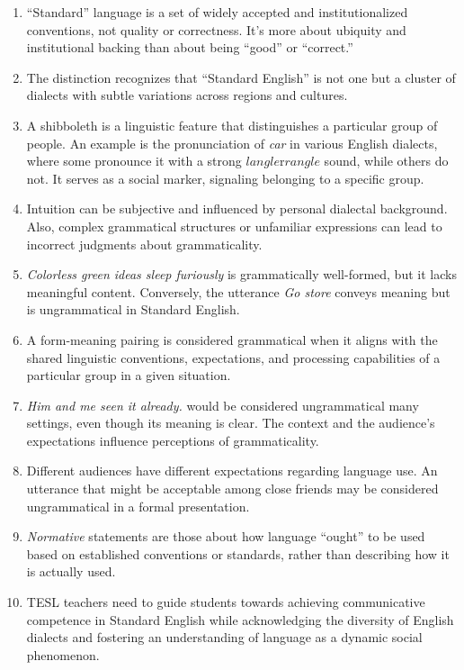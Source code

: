 \begin{tcolorbox}[title=Answer key, colback=white]

\begin{enumerate}[noitemsep]
    \item ``Standard'' language is a set of widely accepted and institutionalized conventions, not quality or correctness. It's more about ubiquity and institutional backing than about being ``good'' or ``correct.''
    \item The distinction recognizes that ``Standard English'' is not one but a cluster of dialects with subtle variations across regions and cultures.
    \item A shibboleth is a linguistic feature that distinguishes a particular group of people. An example is the pronunciation of \textit{car} in various English dialects, where some pronounce it with a strong $langle$r$rangle$ sound, while others do not. It serves as a social marker, signaling belonging to a specific group.
    \item Intuition can be subjective and influenced by personal dialectal background. Also, complex grammatical structures or unfamiliar expressions can lead to incorrect judgments about grammaticality.
    \item \textit{Colorless green ideas sleep furiously} is grammatically well-formed, but it lacks meaningful content. Conversely, the utterance \textit{Go store} conveys meaning but is ungrammatical in Standard English.
    \item A form-meaning pairing is considered grammatical when it aligns with the shared linguistic conventions, expectations, and processing capabilities of a particular group in a given situation.
    \item \textit{Him and me seen it already.} would be considered ungrammatical many settings, even though its meaning is clear. The context and the audience's expectations influence perceptions of grammaticality.
    \item Different audiences have different expectations regarding language use. An utterance that might be acceptable among close friends may be considered ungrammatical in a formal presentation.
    \item \textit{Normative} statements are those about how language ``ought'' to be used based on established conventions or standards, rather than describing how it is actually used.
    \item TESL teachers need to guide students towards achieving communicative competence in Standard English while acknowledging the diversity of English dialects and fostering an understanding of language as a dynamic social phenomenon.
\end{enumerate}
\end{tcolorbox}

